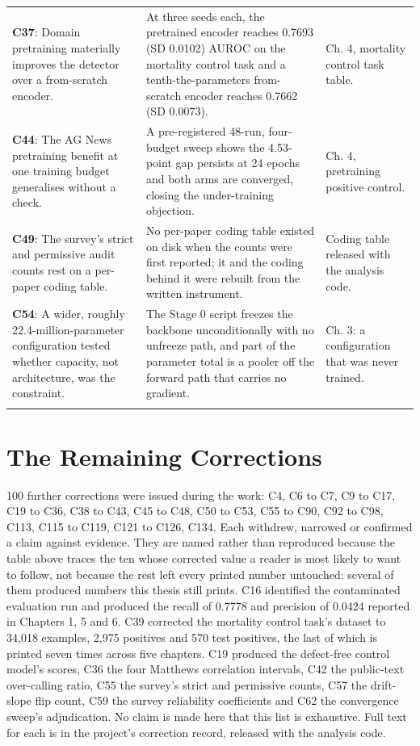 \begin{longtable}{@{}p{1.9in}p{1.9in}p{1.9in}@{}}
\textbf{C37}: Domain pretraining materially improves the detector over a from-scratch encoder. & At three seeds each, the pretrained encoder reaches 0.7693 (SD 0.0102) AUROC on the mortality control task and a tenth-the-parameters from-scratch encoder reaches 0.7662 (SD 0.0073). & Ch. 4, mortality control task table.\\
\addlinespace
\textbf{C44}: The AG News pretraining benefit at one training budget generalises without a check. & A pre-registered 48-run, four-budget sweep shows the 4.53-point gap persists at 24 epochs and both arms are converged, closing the under-training objection. & Ch. 4, pretraining positive control.\\
\addlinespace
\textbf{C49}: The survey's strict and permissive audit counts rest on a per-paper coding table. & No per-paper coding table existed on disk when the counts were first reported; it and the coding behind it were rebuilt from the written instrument. & Coding table released with the analysis code.\\
\addlinespace
\textbf{C54}: A wider, roughly 22.4-million-parameter configuration tested whether capacity, not architecture, was the constraint. & The Stage 0 script freezes the backbone unconditionally with no unfreeze path, and part of the parameter total is a pooler off the forward path that carries no gradient. & Ch. 3: a configuration that was never trained.\\
\addlinespace
\end{longtable}
\normalsize
\doublespacing

\section{The Remaining Corrections}

100 further corrections were issued during the work: C4, C6 to C7, C9 to C17, C19 to C36, C38 to C43, C45 to C48, C50 to C53, C55 to C90, C92 to C98, C113, C115 to C119, C121 to C126, C134. Each withdrew, narrowed or confirmed a claim against evidence. They are named rather than reproduced because the table above traces the ten whose corrected value a reader is most likely to want to follow, not because the rest left every printed number untouched: several of them produced numbers this thesis still prints. C16 identified the contaminated evaluation run and produced the recall of 0.7778 and precision of 0.0424 reported in Chapters 1, 5 and 6. C39 corrected the mortality control task's dataset to 34,018 examples, 2,975 positives and 570 test positives, the last of which is printed seven times across five chapters. C19 produced the defect-free control model's scores, C36 the four Matthews correlation intervals, C42 the public-text over-calling ratio, C55 the survey's strict and permissive counts, C57 the drift-slope flip count, C59 the survey reliability coefficients and C62 the convergence sweep's adjudication. No claim is made here that this list is exhaustive. Full text for each is in the project's correction record, released with the analysis code.

